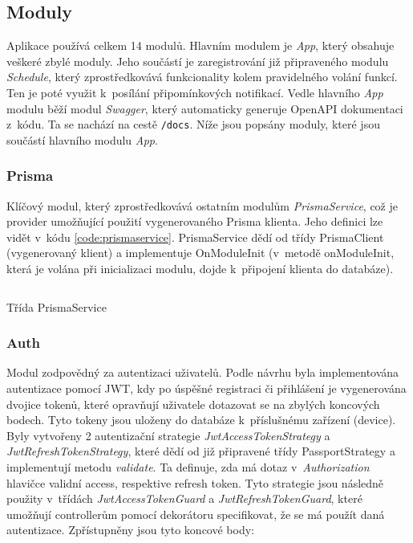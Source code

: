 \documentclass[thesis=M,czech]{FITthesis}[2019/12/23]
\begin{document}
\subsection{Moduly}
Aplikace používá celkem 14 modulů. Hlavním modulem je \textit{App}, který obsahuje veškeré zbylé moduly. Jeho součástí je zaregistrování již připraveného modulu \textit{Schedule}, který zprostředkovává funkcionality kolem pravidelného volání funkcí. Ten je poté využit k~posílání připomínkových notifikací. Vedle hlavního \textit{App} modulu běží modul \textit{Swagger}, který automaticky generuje \mbox{OpenAPI} dokumentaci z~kódu. Ta se nachází na cestě \texttt{/docs}. Níže jsou popsány moduly, které jsou součástí hlavního modulu \textit{App}.

\subsubsection{Prisma}
Klíčový modul, který zprostředkovává ostatním modulům \textit{PrismaService}, což je provider umožňující použití vygenerovaného Prisma klienta. Jeho definici lze vidět v~kódu \ref{code:prismaservice}. PrismaService dědí od třídy PrismaClient (vygenerovaný klient) a implementuje OnModuleInit (v~metodě onModuleInit, která je volána při inicializaci modulu, dojde k~připojení klienta do databáze).

\begin{listing}
    \inputminted{javascript}{code/prismaservice.txt}
    \caption{Třída PrismaService}
    \label{code:prismaservice}
\end{listing}

\subsubsection{Auth}
Modul zodpovědný za autentizaci uživatelů. Podle návrhu byla implementována autentizace pomocí JWT, kdy po úspěšné registraci či přihlášení je vygenerována dvojice tokenů, které opravňují uživatele dotazovat se na zbylých koncových bodech. Tyto tokeny jsou uloženy do databáze k~příslušnému zařízení (device). Byly vytvořeny 2 autentizační strategie \textit{JwtAccessTokenStrategy} a \textit{JwtRefreshTokenStrategy}, které dědí od již připravené třídy PassportStrategy a implementují metodu \textit{validate}. Ta definuje, zda má dotaz v~\textit{Authorization} hlavičce validní access, respektive refresh token. Tyto strategie jsou následně použity v~třídách \textit{JwtAccessTokenGuard} a \textit{JwtRefreshTokenGuard}, které umožňují controllerům pomocí dekorátoru specifikovat, že se má použít daná autentizace. Zpřístupněny jsou tyto koncové body:
\end{document}
